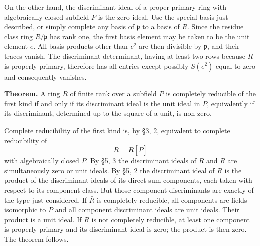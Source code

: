 \documentclass[
  12pt,
]{article}
\begin{document}
On the other hand, the discriminant ideal of a proper primary ring with
algebraically closed subfield \(P\) is the zero ideal. Use the special
basis just described, or simply complete any basis of \(\mathfrak p\) to
a basis of \(R\). Since the residue class ring \(R/\mathfrak p\) has
rank one, the first basis element may be taken to be the unit element
\(e\). All basis products other than \(e^2\) are then divisible by
\(\mathfrak p\), and their traces vanish. The discriminant determinant,
having at least two rows because \(R\) is properly primary, therefore
has all entries except possibly \(S(e^2)\) equal to zero and
consequently vanishes.

\textbf{Theorem.} A ring \(R\) of finite rank over a subfield \(P\) is
completely reducible of the first kind if and only if its discriminant
ideal is the unit ideal in \(P\), equivalently if its discriminant,
determined up to the square of a unit, is non-zero.

Complete reducibility of the first kind is, by §3, 2, equivalent to
complete reducibility of \[
  \bar R=R[\bar P]
\] with algebraically closed \(\bar P\). By §5, 3 the discriminant
ideals of \(R\) and \(\bar R\) are simultaneously zero or unit ideals.
By §5, 2 the discriminant ideal of \(\bar R\) is the product of the
discriminant ideals of its direct-sum components, each taken with
respect to its component class. But those component discriminants are
exactly of the type just considered. If \(\bar R\) is completely
reducible, all components are fields isomorphic to \(\bar P\) and all
component discriminant ideals are unit ideals. Their product is a unit
ideal. If \(\bar R\) is not completely reducible, at least one component
is properly primary and its discriminant ideal is zero; the product is
then zero. The theorem follows.
\end{document}
